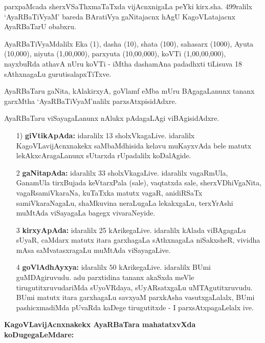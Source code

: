 parxpaMcada sherxVSaThxmaTaTxda vijAcnxnigaLa peYki kirx.sha. {\rm 499}ralilx `AyaRBaTiVyaM' bareda BAratiVya gaNitajacnx hAgU KagoVLatajacnx AyaRBaTarU obabxru.

AyaRBaTiVyaMdalilx Eka ({\rm 1}), dasha ({\rm 10}), shata ({\rm 100}), sahasarx ({\rm 1000}), Ayuta ({\rm 10,000}), niyuta ({\rm 1,00,000}), parxyuta ({\rm 10,00,000}), koVTi ({\rm 1,00,00,000}), nayxbuRda athavA nUru koVTi - iMtha dashamAna padadhxti tiLisuva {\rm 18} sAthxnagaLu gurutisalapxTiTxve.


AyaRBaTaru gaNita, kAlakirxyA, goVlamf eMba mUru BAgagaLanunx tananx garxMtha `AyaRBaTiVyaM'nalilx parxsAtxpisidAdxre.

AyaRBaTaru viSayagaLanunx nAlukx pAdagaLAgi viBAgisidAdxre.
\begin{itemize}
\item[{\rm 1)}] {\bf giVtikApAda:} idaralilx {\rm 13} sholxVkagaLive. idaralilx KagoVLavijAcnxnakekx saMbaMdhisida kelavu muKayxvAda bele matutx lekAkxcAragaLanunx sUtarxda rUpadalilx koDalAgide.

\item[{\rm 2}] {\bf gaNitapAda:} idaralilx {\rm 33} sholxVkagaLive. idaralilx vagaRmUla, GanamUla tirxBujada keVtarxPala (sale), vaqtatxda sale, sherxVDhiVgaNita, vagaRsamiVkaraNa, kuTaTxka matutx vagaR, anidiRSaTx samiVkaraNagaLu, shaMkuvina neraLugaLa lekakxgaLu, terxYrAshi muMtAda viSayagaLa bagegx vivaraNeyide. 
  
\item[{\rm 3}] {\bf kirxyApAda:} idaralilx {\rm 25} kArikegaLive. idaralilx kAlada viBAgagaLu sUyaR, caMdarx matutx itara garxhagaLa sAthxnagaLa niSakxsheR, vividha mAsa saMvatasxragaLu muMtAda viSayagaLive.
 
\item[{\rm 4}] {\bf goVlAdhAyxya:} idaralilx $50$ kArikegaLive. idaralilx BUmi guMDAgiru\-vudu. adu parxtidina tananx akaSxda meVle tirugutitxruvudariMda sUyoVR\-daya, sUyARsatxgaLu uMTAgutitxruvudu. BUmi matutx itara garxhagaLu savxyaM parxkAsha vasutxgaLalalx, BUmi pashicxmadiMda pUvaRda kaDege tirugutitxde - I parxsAtxpagaLelalx ive.
  \end{itemize}


\noindent
{\bf KagoVLavijAcnxnakekx AyaRBaTara mahatatxvXda koDugegaLeMdare:}

